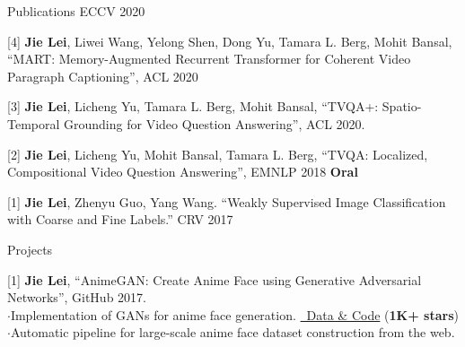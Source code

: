 \documentclass{resume} %
\begin{document}
\begin{rSection}{Publications}
{            ECCV 2020
            }
   \item {[4] \textbf{Jie Lei}, Liwei Wang, Yelong Shen, Dong Yu, Tamara L. Berg, Mohit Bansal,
         ``MART: Memory-Augmented Recurrent Transformer for Coherent Video Paragraph Captioning'',
         ACL 2020
         }
   \item {[3] \textbf{Jie Lei}, Licheng Yu, Tamara L. Berg, Mohit Bansal,
               ``TVQA+: Spatio-Temporal Grounding for Video Question Answering'',
               ACL 2020.
               }
    \item {[2] \textbf{Jie Lei}, Licheng Yu, Mohit Bansal, Tamara L. Berg,
               ``TVQA: Localized, Compositional Video Question Answering'',
               EMNLP 2018 {\color{bittersweet}\textbf{Oral}}
               }
    \item {[1] \textbf{Jie Lei}, Zhenyu Guo, Yang Wang.
                ``Weakly Supervised Image Classification with Coarse and Fine Labels.''
                CRV 2017
                }
\end{rSection}


\begin{rSection}{Projects}
    \item {[1] \textbf{Jie Lei},
                ``AnimeGAN: Create Anime Face using Generative Adversarial Networks'',
                GitHub 2017.
                \\ $\cdot$\quad Implementation of GANs for anime face generation.
                \href{https://github.com/jayleicn/animeGAN}{\color{codelinkcolor}\faGithub~Data \& Code} (\textbf{1K+ stars})
                \\ $\cdot$\quad Automatic pipeline for large-scale anime face dataset construction from the web.}
\end{rSection}


\end{document}
